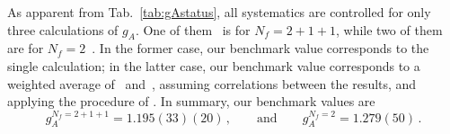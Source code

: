 
As apparent from Tab.~\ref{tab:gAstatus}, all systematics are controlled for
only three calculations of $g_A$.
%
One of them~\cite{Bhattacharya:2016zcn} is for $N_f=2+1+1$, while two of them
are for $N_f=2$~\cite{Capitani:2017qpc,Bali:2014nma}.
%
In the former case, our benchmark value corresponds to the single calculation;
in the latter case, our benchmark value corresponds to a weighted average 
of~\cite{Capitani:2017qpc} and~\cite{Bali:2014nma}, assuming correlations
between the results, and applying the procedure of \cite{XXX}.
%
In summary, our benchmark values are
\begin{equation}\label{eq:gAcriteria}
g_A^{N_f=2+1+1} = 1.195(33)(20)
\,,\qquad \mathrm{and}\qquad 
g_A^{N_f=2} = 1.279(50)\,.
\end{equation}

%
%

